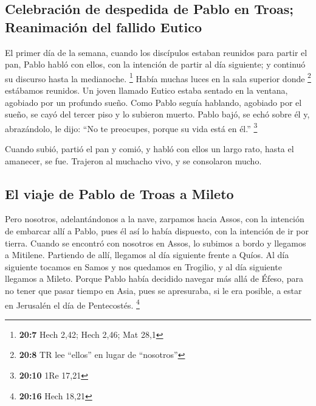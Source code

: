 \begin{paracol}{2}
\hypertarget{celebraciuxf3n-de-despedida-de-pablo-en-troas-reanimaciuxf3n-del-fallido-eutico}{%
\subsection{Celebración de despedida de Pablo en Troas; Reanimación del
fallido
Eutico}\label{celebraciuxf3n-de-despedida-de-pablo-en-troas-reanimaciuxf3n-del-fallido-eutico}}

 El primer día de la semana, cuando los discípulos estaban
reunidos para partir el pan, Pablo habló con ellos, con la intención de
partir al día siguiente; y continuó su discurso hasta la medianoche.
\footnote{\textbf{20:7} Hech 2,42; Hech 2,46; Mat 28,1} 
Había muchas luces en la sala superior donde \footnote{\textbf{20:8} TR
  lee ``ellos'' en lugar de ``nosotros''} estábamos reunidos.
 Un joven llamado Eutico estaba sentado en la ventana,
agobiado por un profundo sueño. Como Pablo seguía hablando, agobiado por
el sueño, se cayó del tercer piso y lo subieron muerto. 
Pablo bajó, se echó sobre él y, abrazándolo, le dijo: ``No te preocupes,
porque su vida está en él.'' \footnote{\textbf{20:10} 1Re 17,21}

 Cuando subió, partió el pan y comió, y habló con ellos
un largo rato, hasta el amanecer, se fue.  Trajeron al
muchacho vivo, y se consolaron mucho.

\hypertarget{el-viaje-de-pablo-de-troas-a-mileto}{%
\subsection{El viaje de Pablo de Troas a
Mileto}\label{el-viaje-de-pablo-de-troas-a-mileto}}

 Pero nosotros, adelantándonos a la nave, zarpamos hacia
Assos, con la intención de embarcar allí a Pablo, pues él así lo había
dispuesto, con la intención de ir por tierra.  Cuando se
encontró con nosotros en Assos, lo subimos a bordo y llegamos a
Mitilene.  Partiendo de allí, llegamos al día siguiente
frente a Quíos. Al día siguiente tocamos en Samos y nos quedamos en
Trogilio, y al día siguiente llegamos a Mileto.  Porque
Pablo había decidido navegar más allá de Éfeso, para no tener que pasar
tiempo en Asia, pues se apresuraba, si le era posible, a estar en
Jerusalén el día de Pentecostés. \footnote{\textbf{20:16} Hech 18,21}

\hypertarget{encuentro-de-pablo-con-los-ancianos-de-uxe9feso-en-mileto-su-discurso-de-despedida-y-su-despedida}{%
}
\end{paracol}
